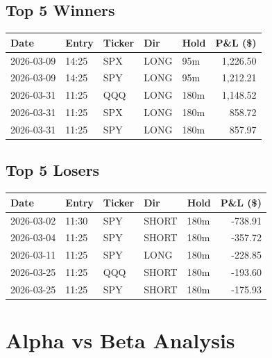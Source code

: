 \documentclass[11pt,a4paper,twoside]{article}
\begin{document}
\subsection{Top 5 Winners}
\noindent\begin{center}
\begin{tabular}{>{\color{txtmain}}l llll r}
\toprule
\rowcolor{cardbg}
\textbf{Date} & \textbf{Entry} & \textbf{Ticker} & \textbf{Dir} & \textbf{Hold} & \textbf{P\&L (\$)} \\
\midrule
2026-03-09 & 14:25 & SPX & LONG & 95m & \textcolor{wingreen}{1,226.50} \\
2026-03-09 & 14:25 & SPY & LONG & 95m & \textcolor{wingreen}{1,212.21} \\
2026-03-31 & 11:25 & QQQ & LONG & 180m & \textcolor{wingreen}{1,148.52} \\
2026-03-31 & 11:25 & SPX & LONG & 180m & \textcolor{wingreen}{858.72} \\
2026-03-31 & 11:25 & SPY & LONG & 180m & \textcolor{wingreen}{857.97} \\
\bottomrule
\end{tabular}
\end{center}
\subsection{Top 5 Losers}
\noindent\begin{center}
\begin{tabular}{>{\color{txtmain}}l llll r}
\toprule
\rowcolor{cardbg}
\textbf{Date} & \textbf{Entry} & \textbf{Ticker} & \textbf{Dir} & \textbf{Hold} & \textbf{P\&L (\$)} \\
\midrule
2026-03-02 & 11:30 & SPY & SHORT & 180m & \textcolor{lossred}{-738.91} \\
2026-03-04 & 11:25 & SPY & SHORT & 180m & \textcolor{lossred}{-357.72} \\
2026-03-11 & 11:25 & SPY & LONG & 180m & \textcolor{lossred}{-228.85} \\
2026-03-25 & 11:25 & QQQ & SHORT & 180m & \textcolor{lossred}{-193.60} \\
2026-03-25 & 11:25 & SPY & SHORT & 180m & \textcolor{lossred}{-175.93} \\
\bottomrule
\end{tabular}
\end{center}
\clearpage
\clearpage
\section{Alpha vs Beta Analysis}
\end{document}
